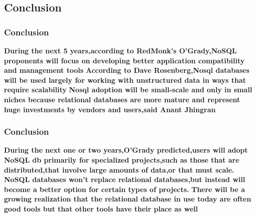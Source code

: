 \documentclass{beamer}
\begin{document}
\subsection[]{Conclusion}
\begin{frame}\frametitle{Conclusion}
\begin{center}
\textbf{During the next 5 years,according to RedMonk's O'Grady,NoSQL proponents will focus on developing better application compatibility and management tools}
\newline\newline
\textbf{According to Dave Rosenberg,Nosql databases will be used largely for working with unstructured data in ways that require scalability}
\newline\newline
\textbf{Nosql adoption will be small-scale and only in small niches because relational databases are more mature and represent huge investments by vendors and users,said Anant Jhingran}
\end{center}
\end{frame}

\begin{frame}\frametitle{Conclusion}
\begin{center}
\textbf{During the next one or two years,O'Grady predicted,users will adopt NoSQL db primarily for specialized projects,such as those that are distributed,that involve large amounts of data,or that must scale.}
\newline\newline
\textbf{NoSQL databases won't replace relational databases,but instead will become a better option for certain types of projects.}
\newline\newline
\textbf{There will be a growing realization that the relational database in use today are often good tools but that other tools have their place as well}
\end{center}
\end{frame}
\end{document}
